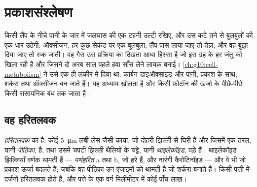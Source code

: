 \chapter{प्रकाशसंश्लेषण}\label{ch:g12:photosynthesis}

किसी लैंप के नीचे पानी के जार में जलघास की एक टहनी उल्टी रखिए, और उस कटे तने
से बुलबुलों की एक धार उठेगी: ऑक्सीजन, हर कुछ सेकंड पर एक बुलबुला, लैंप पास
लाया जाए तो तेज़, और वह बुझा दिया जाए तो रुक जाती। वह गैस उस प्रक्रिया का
दिखता आधा हिस्सा है जो इस ग्रह के हर जंतु को खिला रही है और जिसने दो अरब साल
पहले हवा साँस लेने लायक़ बनाई। \cref{ch:g10:cell-metabolism} ने उसे एक ही
लकीर में दिया था: कार्बन डाइऑक्साइड और पानी, प्रकाश के साथ, शर्करा तथा
ऑक्सीजन बन जाते हैं। यह अध्याय  खोलता है और किसी फ़ोटॉन की ऊर्जा के
पीछे-पीछे किसी रासायनिक बंध तक जाता है।

\section{वह हरितलवक}

\begin{definition}[हरितलवक]\label{def:g12:photosynthesis:chloroplast}
\emph{हरितलवक}  का  है: कोई
\qty{5}{\micro m} लंबी लेंस जैसी काया, जो दोहरी झिल्ली से घिरी है और जिसमें
एक तरल, यानी \emph{पीठिका}, है, तथा उसमें चपटी झिल्ली थैलियों के चट्टे, यानी
\emph{थाइलेकॉइड}, पड़े हैं। थाइलेकॉइड झिल्लियाँ वर्णक
थामती हैं --- \emph{पर्णहरित} a तथा b, जो हरे हैं, और नारंगी कैरोटिनॉइड ---
और वे  भी जो प्रकाश ऊर्जा बदलते हैं; जबकि वह पीठिका उन एंजाइमों को
थामती है जो शर्करा बनाते हैं। किसी पत्ती  में दर्जनों हरितलवक होते
हैं, और पत्ते के एक वर्ग मिलीमीटर में कोई पाँच लाख।
\end{definition}

